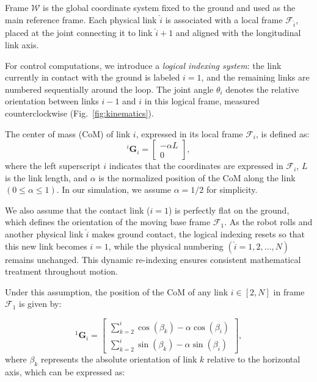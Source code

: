 \documentclass[a4paper, 10pt, conference]{ieeeconf}
\newcommand{\figref}[1]{Fig.~\ref{#1}}
\begin{document}
Frame $\mathcal{W}$ is the global coordinate system fixed to the ground and used as the main reference frame. Each physical link $\hat{i}$ is associated with a local frame $\mathcal{F}_{\hat{i}}$, placed at the joint connecting it to link $\hat{i}+1$ and aligned with the longitudinal link axis.  

For control computations, we introduce a \textit{logical indexing system}: the link currently in contact with the ground is labeled $i=1$, and the remaining links are numbered sequentially around the loop. The joint angle $\theta_i$ denotes the relative orientation between links $i-1$ and $i$ in this logical frame, measured counterclockwise (\figref{fig:kinematics}).  

The center of mass (CoM) of link $i$, expressed in its local frame $\mathcal{F}_i$, is defined as:
\begin{equation}
    {}^{i}\mathbf{G}_i =
    \begin{bmatrix}
        -\alpha L\\
        0
    \end{bmatrix},
\end{equation}
where the left superscript $i$ indicates that the coordinates are expressed in $\mathcal{F}_i$, $L$ is the link length, and $\alpha$ is the normalized position of the CoM along the link $(0 \leq \alpha \leq 1)$. In our simulation, we assume $\alpha = 1/2$ for simplicity.  

We also assume that the contact link ($i=1$) is perfectly flat on the ground, which defines the orientation of the moving base frame $\mathcal{F}_1$. As the robot rolls and another physical link $\hat{i}$ makes ground contact, the logical indexing resets so that this new link becomes $i=1$, while the physical numbering $(\hat{i} = 1, 2, \ldots, N)$ remains unchanged. This dynamic re-indexing ensures consistent mathematical treatment throughout motion.  

Under this assumption, the position of the CoM of any link $i \in [2, N]$ in frame $\mathcal{F}_1$ is given by:


\begin{equation}
    {}^{1}\!\mathbf{G}_i =
    \begin{bmatrix}
        \displaystyle \sum_{k=2}^{i}\cos(\beta_{k}) - \alpha\cos(\beta_{i}) \\
        \displaystyle \sum_{k=2}^{i}\sin(\beta_{k}) - \alpha\sin(\beta_{i})
    \end{bmatrix},
\end{equation}
\noindent
where $\beta_k$ represents the absolute orientation of link $k$ relative to the horizontal axis, which can be expressed as:
\end{document}
